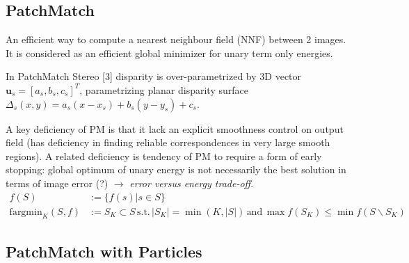 \documentclass[a4paper,12pt]{article}
\begin{document}
\subsection*{PatchMatch}
An efficient way to compute a nearest neighbour field (NNF) between 2 images. It is considered as an efficient global minimizer for unary term only energies.

In PatchMatch Stereo [3] disparity is over-parametrized by 3D vector $\mathbf{u}_s = [ a_s, b_s, c_s ]^T$, parametrizing planar disparity surface $\Delta_s(x,y)=a_s(x-x_s)+b_s(y-y_s)+c_s$. 

A key deficiency of PM is that it lack an explicit smoothness control on output field (has deficiency in finding reliable correspondences in very large smooth regions).
A related deficiency is tendency of PM to require a form of early stopping: global optimum of unary energy is not necessarily the best solution in terms of image error (?) $\rightarrow$ \textit{error versus energy trade-off}. 
\begin{align*}
f(S) &:= \{f(s)|s \in S\} \\
\text{fargmin}_K(S,f) &:= S_K \subset S \, \text{s.t.} \, |S_K| = \min(K,|S|) \,\text{and}\, \max f(S_K) \leq \min f(S \backslash S_K)
\end{align*}

\subsection{PatchMatch with Particles}
\end{document}
